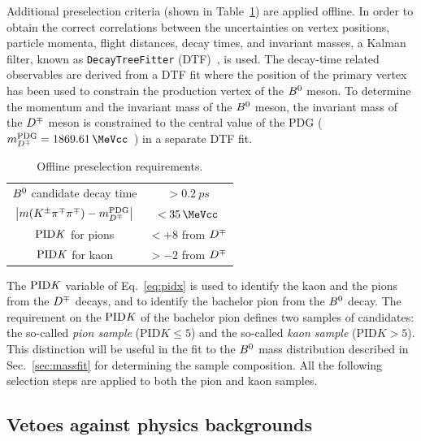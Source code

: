 Additional preselection criteria (shown in Table~\ref{tab:preselection}) are
applied offline. In order to obtain the correct correlations between the uncertainties
on vertex positions, particle momenta, flight distances, decay times, and
invariant masses, a Kalman filter, known as \verb!DecayTreeFitter! (DTF)~\cite{DTF}, is used. 
The decay-time related observables are derived
from a DTF fit where the position of the primary vertex has been used to
constrain the production vertex of the $B^0$ meson. To determine the momentum and
the invariant mass of the $B^0$ meson, the invariant mass of the $D^\mp$ meson is
constrained to the central value of the PDG
($m_{\Dmp}^\text{PDG}=\SI{1869.61}{\MeVcc}$~\cite{PDG}) in a separate DTF
fit.
%
\begin{table}[t]
	\centering
	\caption{Offline preselection requirements.}
	\begin{tabular}{cc}
		\toprule
		$B^0$ candidate decay time & $>\SI{0.2}{ps}$\\
		$\left|m(K^\pm\pi^\mp\pi^\mp)-m_{D^\mp}^\text{PDG}\right|$ & $<\SI{35}{\MeVcc}$\\
		$\rm{PID}\it{K}$ for pions & $<+8$ from $D^\mp$\\
		$\rm{PID}\it{K}$ for kaon & $>-2$ from $D^\mp$\\
		\bottomrule
	\end{tabular}
	\label{tab:preselection}
\end{table}
%
The $\rm{PID}\it{K}$ variable of Eq.~\ref{eq:pidx} is used to identify the kaon and
the pions from the $D^\mp$ decays, and to identify the bachelor pion from the $B^0$
decay. The requirement on the $\rm{PID}\it{K}$ of the bachelor pion defines two samples
of candidates: the so-called \emph{pion sample }(PID$K\leq 5$)
and the so-called \emph{kaon sample} (PID$K>5$). This distinction will be
useful in the fit to the $B^0$ mass distribution described in Sec.~\ref{sec:massfit} for determining the sample
composition. 
All the following selection steps are applied to both the pion and kaon samples.

\subsection{Vetoes against physics backgrounds}
\label{sec:vetoes}

